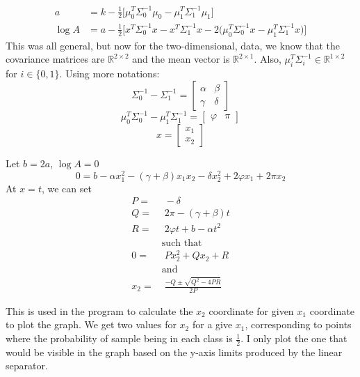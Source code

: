 \documentclass[11pt]{article}
\begin{document}
\begin{align*}
a &= k - \frac{1}{2}\bigl[
\mu_0^T\Sigma_0^{-1}\mu_0
-
\mu_1^T\Sigma_1^{-1}\mu_1
\bigr]\\
\log A &= a - \frac{1}{2}\bigl[
x^T\Sigma_0^{-1}x - x^T\Sigma_1^{-1}x
-2\bigl(
\mu_0^T\Sigma_0^{-1}x - \mu_1^T\Sigma_1^{-1}x
\bigr)
\bigr]
\end{align*}
This was all general, but now for the two-dimensional, data, we know
that the covariance matrices are \(\mathbb{R}^{2\times 2}\) and the mean vector
is \(\mathbb{R}^{2\times 1}\). Also,
\(\mu_i^T\Sigma_i^{-1}\in\mathbb{R}^{1\times 2}\) for
\(i\in\{0,1\}\). Using more notations:
\begin{equation*}
\Sigma_0^{-1}-\Sigma_1^{-1}=
\begin{bmatrix}
\alpha&\beta\\
\gamma&\delta
\end{bmatrix}
\end{equation*}
\begin{equation*}
\mu_0^T\Sigma_0^{-1}-\mu_1^T\Sigma_1^{-1}=
\begin{bmatrix}
\varphi&\pi
\end{bmatrix}
\end{equation*}
\begin{equation*}
x=
\begin{bmatrix}
x_1\\
x_2
\end{bmatrix}
\end{equation*}

Let \(b=2a\), \(\log A=0\)
\begin{equation*}
0 = b - \alpha x_1^2 - (\gamma + \beta)x_1 x_2 - \delta x_2^2 + 2\varphi x_1 +2\pi x_2
\end{equation*}
At \(x=t\), we can set
\begin{align*}
P =&\; -\delta\\
Q =&\; 2\pi - (\gamma+\beta)t\\
R =&\; 2\varphi t+b-\alpha t^2\\
&\text{such that}\\
0 =&\; Px_2^2+Qx_2+R\\
&\text{and}\\
x_2 =&\; \frac{-Q\pm \sqrt{Q^2-4PR}}{2P}
\end{align*}

This is used in the program to calculate the \(x_2\) coordinate for
given \(x_1\) coordinate to plot the graph. We get two values for
\(x_2\) for a give \(x_1\), corresponding to points where the
probability of sample being in each class is
\(\displaystyle\frac{1}{2}\). I only plot the one that would be
visible in the graph based on the y-axis limits produced by the linear separator.
\end{document}
